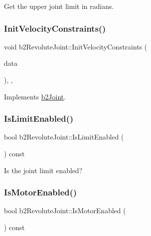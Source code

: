 Get the upper joint limit in radians. 

\mbox{\label{classb2_revolute_joint_a5ddddb865cc297c66721ae443bfb40a4}} 
\subsubsection{\texorpdfstring{InitVelocityConstraints()}{InitVelocityConstraints()}}
{\footnotesize\ttfamily void b2\+Revolute\+Joint\+::\+Init\+Velocity\+Constraints (\begin{DoxyParamCaption}\item[{const \mbox{\hyperlink{structb2_solver_data}{b2\+Solver\+Data}} \&}]{data }\end{DoxyParamCaption})\hspace{0.3cm}{\ttfamily [override]}, {\ttfamily [protected]}, {\ttfamily [virtual]}}



Implements \mbox{\hyperlink{classb2_joint_a599c013de5514e02684b958b31dd76a4}{b2\+Joint}}.

\mbox{\label{classb2_revolute_joint_a84ff9c4f82b3e7d27a4390164f81f3ab}} 
\subsubsection{\texorpdfstring{IsLimitEnabled()}{IsLimitEnabled()}}
{\footnotesize\ttfamily bool b2\+Revolute\+Joint\+::\+Is\+Limit\+Enabled (\begin{DoxyParamCaption}{ }\end{DoxyParamCaption}) const}



Is the joint limit enabled? 

\mbox{\label{classb2_revolute_joint_a37d5744e89991ebe01b974c4d15a21b5}} 
\subsubsection{\texorpdfstring{IsMotorEnabled()}{IsMotorEnabled()}}
{\footnotesize\ttfamily bool b2\+Revolute\+Joint\+::\+Is\+Motor\+Enabled (\begin{DoxyParamCaption}{ }\end{DoxyParamCaption}) const}



